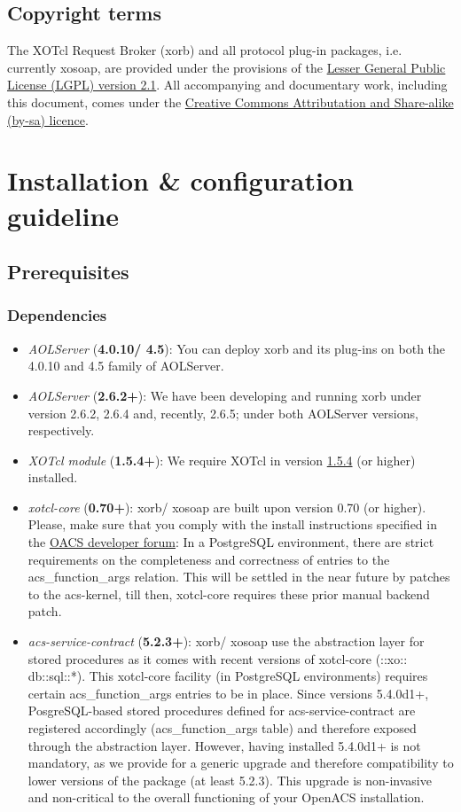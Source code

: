 \subsection{Copyright terms}
The XOTcl Request Broker (xorb) and all protocol plug-in packages, i.e. currently xosoap, are provided 
under the provisions of the \href{http://creativecommons.org/licenses/LGPL/2.1/}{Lesser General Public 
License (LGPL) version 2.1}. All accompanying and documentary work, including this document, comes 
under the \href{http://creativecommons.org/licenses/by-sa/2.0/at/}{Creative Commons Attributation and 
Share-alike (by-sa) licence}.

     \section{Installation \& configuration guideline}
     	\subsection{Prerequisites}
	\subsubsection{Dependencies}
	\begin{itemize}
	\item \emph{AOLServer} (\textbf{4.0.10/ 4.5}): You can deploy xorb and its plug-ins on both the 4.0.10 and 4.5 family of AOLServer.
	\item \emph{AOLServer} (\textbf{2.6.2+}): We have been developing and running xorb under version 2.6.2, 2.6.4 and, recently, 2.6.5; under both AOLServer versions, respectively.
	\item \emph{XOTcl module} (\textbf{1.5.4+}): We require XOTcl in version \href{http://media.wu-wien.ac.at/download/xotcl-1.5.4.tar.gz}{1.5.4} (or higher) installed.
	\item \emph{xotcl-core} (\textbf{0.70+}): xorb/ xosoap are built upon version 0.70 (or higher).
	 Please, make sure that you comply with the install instructions specified in the \href{http://openacs.org/forums/message-view?message_id=1165990}{OACS developer forum}: In a PostgreSQL environment, there are strict requirements on the completeness and correctness of entries to the acs\_function\_args relation. This will be settled in the near future by patches to the acs-kernel, till then, xotcl-core requires these prior manual backend patch.
	\item \emph{acs-service-contract} (\textbf{5.2.3+}): xorb/ xosoap use the abstraction layer for stored procedures as it comes with recent versions of xotcl-core (::xo:: db::sql::*). This xotcl-core facility (in PostgreSQL environments) requires certain acs\_function\_args entries to be in place. Since versions 5.4.0d1+, PosgreSQL-based stored procedures defined for acs-service-contract  are registered accordingly (acs\_function\_args table) and therefore exposed through the abstraction layer. However, having installed 5.4.0d1+ is not mandatory, as we provide for a generic upgrade and therefore compatibility to lower versions of the package (at least 5.2.3). This upgrade is non-invasive and non-critical to the overall functioning of your OpenACS installation.
	\end{itemize}
